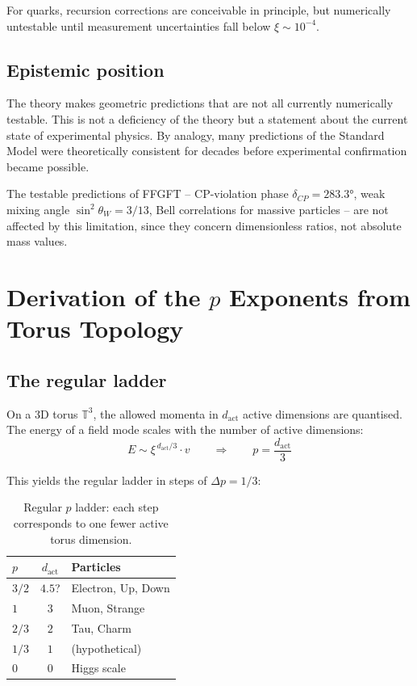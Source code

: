 For quarks, recursion corrections are conceivable in principle, but
numerically untestable until measurement uncertainties fall below
$\xi \sim 10^{-4}$.

\subsection{Epistemic position}

The theory makes geometric predictions that are not all currently
numerically testable. This is not a deficiency of the theory but a
statement about the current state of experimental physics. By analogy,
many predictions of the Standard Model were theoretically consistent
for decades before experimental confirmation became possible.

The testable predictions of FFGFT -- CP-violation phase
$\delta_{CP} = 283.3°$, weak mixing angle $\sin^2\theta_W = 3/13$,
Bell correlations for massive particles -- are not affected by this
limitation, since they concern dimensionless ratios, not absolute
mass values.


\section{Derivation of the \texorpdfstring{$p$}{p} Exponents from Torus Topology}

\subsection{The regular ladder}

On a 3D torus $\mathbb{T}^3$, the allowed momenta in $d_{\text{act}}$
active dimensions are quantised. The energy of a field mode scales
with the number of active dimensions:
\begin{equation}
    E \sim \xi^{\,d_{\text{act}}/3} \cdot v
    \qquad \Rightarrow \qquad
    p = \frac{d_{\text{act}}}{3}
\end{equation}

This yields the regular ladder in steps of $\Delta p = 1/3$:

\begin{table}[htbp]
\centering
\begin{tabular}{lcl}
\toprule
$p$ & $d_{\text{act}}$ & \textbf{Particles} \\
\midrule
$3/2$ & $4.5$? & Electron, Up, Down \\
$1$   & $3$    & Muon, Strange \\
$2/3$ & $2$    & Tau, Charm \\
$1/3$ & $1$    & (hypothetical) \\
$0$   & $0$    & Higgs scale \\
\bottomrule
\end{tabular}
\caption{Regular $p$ ladder: each step corresponds to one fewer active
torus dimension.}
\label{tab:p_ladder}
\end{table}

